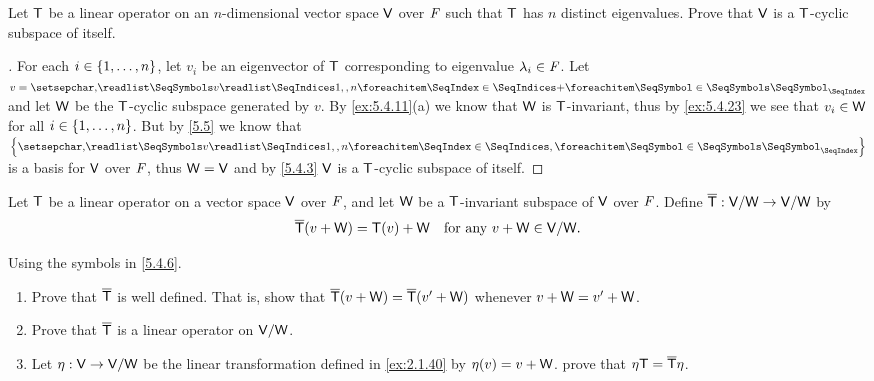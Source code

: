 \begin{ex}\label{ex:5.4.26}
  Let \(\mathsf{T}\) be a linear operator on an \(n\)-dimensional vector space \(\mathsf{V}\) over \(\mathit{F}\) such that \(\mathsf{T}\) has \(n\) distinct eigenvalues.
  Prove that \(\mathsf{V}\) is a \(\mathsf{T}\)-cyclic subspace of itself.
\end{ex}

\begin{proof}[]
  For each \(i \in \left\lbrace1, \dots, n\right\rbrace\), let \(v_i\) be an eigenvector of \(\mathsf{T}\) corresponding to eigenvalue \(\lambda_i \in \mathit{F}\).
  Let \(v = \seq[+]{v}{1,,n}\) and let \(\mathsf{W}\) be the \(\mathsf{T}\)-cyclic subspace generated by \(v\).
  By \cref{ex:5.4.11}(a) we know that \(\mathsf{W}\) is \(\mathsf{T}\)-invariant, thus by \cref{ex:5.4.23} we see that \(v_i \in \mathsf{W}\) for all \(i \in \left\lbrace1, \dots, n\right\rbrace\).
  But by \cref{5.5} we know that \(\set{\seq{v}{1,,n}}\) is a basis for \(\mathsf{V}\) over \(\mathit{F}\), thus \(\mathsf{W} = \mathsf{V}\) and by \cref{5.4.3} \(\mathsf{V}\) is a \(\mathsf{T}\)-cyclic subspace of itself.
\end{proof}

\begin{defn}\label{5.4.6}
  Let \(\mathsf{T}\) be a linear operator on a vector space \(\mathsf{V}\) over \(\mathit{F}\), and let \(\mathsf{W}\) be a \(\mathsf{T}\)-invariant subspace of \(\mathsf{V}\) over \(\mathit{F}\).
  Define \(\overline{\mathsf{T}} : \mathsf{V} / \mathsf{W} \to \mathsf{V} / \mathsf{W}\) by
  \[
    \overline{\mathsf{T}}(v + \mathsf{W}) = \mathsf{T}(v) + \mathsf{W} \quad \text{for any } v + \mathsf{W} \in \mathsf{V} / \mathsf{W}.
  \]
\end{defn}

\begin{ex}\label{ex:5.4.27}
  Using the symbols in \cref{5.4.6}.
  \begin{enumerate}
    \item Prove that \(\overline{\mathsf{T}}\) is well defined.
          That is, show that \(\overline{\mathsf{T}}(v + \mathsf{W}) = \overline{\mathsf{T}}(v' + \mathsf{W})\) whenever \(v + \mathsf{W} = v' + \mathsf{W}\).
    \item Prove that \(\overline{\mathsf{T}}\) is a linear operator on \(\mathsf{V} / \mathsf{W}\).
    \item Let \(\eta : \mathsf{V} \to \mathsf{V} / \mathsf{W}\) be the linear transformation defined in \cref{ex:2.1.40} by \(\eta(v) = v + \mathsf{W}\).
          prove that \(\eta \mathsf{T} = \overline{\mathsf{T}} \eta\).
  \end{enumerate}
\end{ex}

